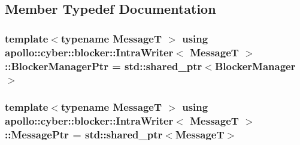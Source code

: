 \subsection{Member Typedef Documentation}
\hypertarget{classapollo_1_1cyber_1_1blocker_1_1IntraWriter_a92d37eb69d0c02aa8eef3824e24b2f64}{
\subsubsection[{Blocker\-Manager\-Ptr}]{\setlength{\rightskip}{0pt plus 5cm}template$<$typename Message\-T $>$ using {\bf apollo\-::cyber\-::blocker\-::\-Intra\-Writer}$<$ Message\-T $>$\-::{\bf Blocker\-Manager\-Ptr} =  std\-::shared\-\_\-ptr$<${\bf Blocker\-Manager}$>$}}\label{classapollo_1_1cyber_1_1blocker_1_1IntraWriter_a92d37eb69d0c02aa8eef3824e24b2f64}
\hypertarget{classapollo_1_1cyber_1_1blocker_1_1IntraWriter_a34952ec52c4ab25fdbbbbc5cb17868f4}{
\subsubsection[{Message\-Ptr}]{\setlength{\rightskip}{0pt plus 5cm}template$<$typename Message\-T $>$ using {\bf apollo\-::cyber\-::blocker\-::\-Intra\-Writer}$<$ Message\-T $>$\-::{\bf Message\-Ptr} =  std\-::shared\-\_\-ptr$<$Message\-T$>$}}\label{classapollo_1_1cyber_1_1blocker_1_1IntraWriter_a34952ec52c4ab25fdbbbbc5cb17868f4}


